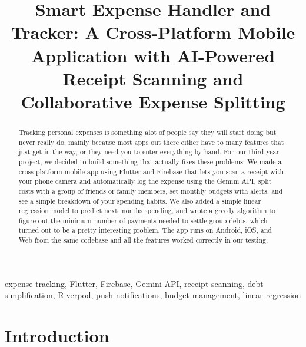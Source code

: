 \documentclass[conference]{IEEEtran}
\begin{document}
\title{Smart Expense Handler and Tracker: A Cross-Platform Mobile Application with AI-Powered Receipt Scanning and Collaborative Expense Splitting}

\author{
}

\maketitle

\begin{abstract}
Tracking personal expenses is something alot of people say they will start doing but never really do, mainly because most apps out there either have to many features that just get in the way, or they need you to enter everything by hand. For our third-year project, we decided to build something that actually fixes these problems. We made a cross-platform mobile app using Flutter and Firebase that lets you scan a receipt with your phone camera and automatically log the expense using the Gemini API, split costs with a group of friends or family members, set monthly budgets with alerts, and see a simple breakdown of your spending habits. We also added a simple linear regression model to predict next months spending, and wrote a greedy algorithm to figure out the minimum number of payments needed to settle group debts, which turned out to be a pretty interesting problem. The app runs on Android, iOS, and Web from the same codebase and all the features worked correctly in our testing.
\end{abstract}

\begin{IEEEkeywords}
expense tracking, Flutter, Firebase, Gemini API, receipt scanning, debt simplification, Riverpod, push notifications, budget management, linear regression
\end{IEEEkeywords}

\section{Introduction}
\end{document}
